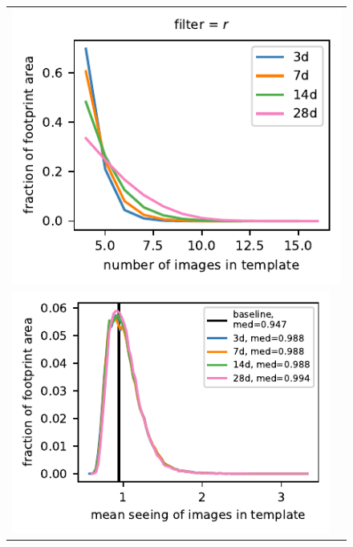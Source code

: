 \documentclass[preprintm,linenumbers]{aastex631}
\begin{document}
  
  \begin{figure}[h]
			\centering
%				
%				
		
	\begin{tabular}{@{}c@{}c@{}}
		\multicolumn{2}{c}{\includegraphics{results/histograms_templates_tscale/hist_first_year_one_snap_v4_0_10yrs_db_noDD_noTwi_doALLTemplateMetrics_reduceNTemplate_r_noDD_noTwi.pdf}} \\
				\includegraphics{results/histograms_templates_tscale/hist_first_year_one_snap_v4_0_10yrs_db_noDD_noTwi_doALLTemplateMetrics_reduceSeeingTemplate_r_noDD_noTwi.pdf} &

\end{tabular}
\end{figure}
\end{document}
